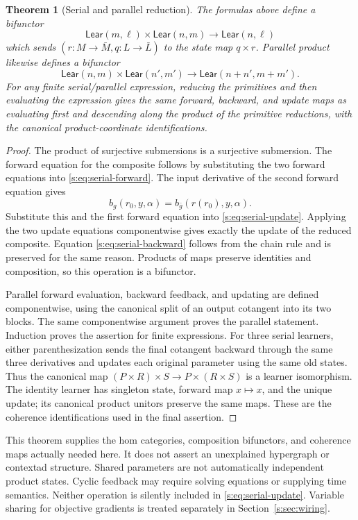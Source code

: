 \documentclass[11pt]{article}
\newtheorem{theorem}{Theorem}[section]
\theoremstyle{definition}
\theoremstyle{remark}\newtheorem{remark}[theorem]{Remark}
\newcommand{\Lear}{\mathsf{Lear}}
\begin{document}
\begin{theorem}[Serial and parallel reduction]\label{s:thm:learner-wiring}
The formulas above define a bifunctor
\[
 \Lear(m,\ell)\times\Lear(n,m)\longrightarrow\Lear(n,\ell)
\]
which sends $(r:M\to\bar M,q:L\to\bar L)$ to the state map $q\times r$.
Parallel product likewise defines a bifunctor
\[
 \Lear(n,m)\times\Lear(n',m')
       \longrightarrow\Lear(n+n',m+m').
\]
For any finite serial/parallel expression, reducing the primitives and then
evaluating the expression gives the same forward, backward, and update maps
as evaluating first and descending along the product of the primitive
reductions, with the canonical product-coordinate identifications.
\end{theorem}
\begin{proof}
The product of surjective submersions is a surjective submersion.
The forward equation for the composite follows by substituting the two
forward equations into \eqref{s:eq:serial-forward}. The input derivative of
the second forward equation gives
\[
 b_g(r_0,y,\alpha)=b_{\bar g}(r(r_0),y,\alpha).
\]
Substitute this and the first forward equation into
\eqref{s:eq:serial-update}. Applying the two update equations componentwise
gives exactly the update of the reduced composite. Equation
\eqref{s:eq:serial-backward} follows from the chain rule and is preserved for
the same reason. Products of maps preserve identities and composition, so
this operation is a bifunctor.

Parallel forward evaluation, backward feedback, and updating are defined
componentwise, using the canonical split of an output cotangent into its
two blocks. The same componentwise argument proves the parallel statement.
Induction proves the assertion for finite expressions. For three serial
learners, either parenthesization sends the final cotangent backward through
the same three derivatives and updates each original parameter using the
same old states. Thus the canonical map
$(P\times R)\times S\to P\times(R\times S)$ is a learner isomorphism.
The identity learner has singleton state, forward map $x\mapsto x$, and
the unique update; its canonical product unitors preserve the same maps.
These are the coherence identifications used in the final assertion.
\end{proof}

This theorem supplies the hom categories, composition bifunctors, and
coherence maps actually needed here. It does not assert an unexplained
hypergraph or contextad structure. Shared parameters are not automatically
independent product states. Cyclic feedback may require solving equations
or supplying time semantics. Neither operation is silently included in
\eqref{s:eq:serial-update}. Variable sharing for objective gradients is treated
separately in Section~\ref{s:sec:wiring}.
\end{document}
